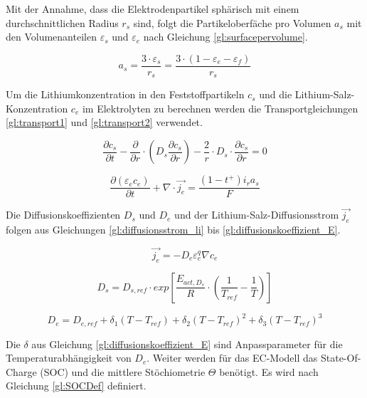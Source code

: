 Mit der Annahme, dass die Elektrodenpartikel sphärisch mit einem durchschnittlichen Radius $r_{s}$ sind, folgt die Partikeloberfäche pro Volumen $a_{s}$ mit den Volumenanteilen $\varepsilon_{s}$ und $\varepsilon_{e}$ nach Gleichung \ref{gl:surfacepervolume}.

\begin{equation}
	a_{s} = \frac{3\cdot \varepsilon_{s}}{r_{s}} = \frac{3 \cdot (1 - \varepsilon_{e} - \varepsilon_{f})}{r_{s}} \label{gl:surfacepervolume}
\end{equation}

Um die Lithiumkonzentration in den Feststoffpartikeln $c_{s}$ und die Lithium-Salz-Konzentration $c_{e}$ im Elektrolyten zu berechnen werden die Transportgleichungen \ref{gl:transport1} und \ref{gl:transport2} verwendet.

\begin{equation}
	\frac{\partial c_{s}}{\partial t} - \frac{\partial}{\partial r}\cdot \left( D_{s} \frac{\partial c_{s}}{\partial r} \right) - \frac{2}{r} \cdot D_{s} \cdot \frac{\partial c_{s}}{\partial r} = 0 \label{gl:transport1}
\end{equation}

\begin{equation}
	\frac{\partial (\varepsilon_{e}c_{e})}{\partial t} + \nabla \cdot \vec{j_{e}} = \frac{(1-t^{+}) i_{r} a_{s}}{F} \label{gl:transport2}
\end{equation}

Die Diffusionskoeffizienten $D_{s}$ und $D_{e}$ und der Lithium-Salz-Diffusionsstrom $\vec{j_{e}}$ folgen aus Gleichungen \ref{gl:diffusionsstrom_li} bis \ref{gl:diffusionskoeffizient_E}.

\begin{equation}
	\vec{j_{e}} = -D_{e} \varepsilon^{q}_{e} \nabla c_{e} \label{gl:diffusionsstrom_li}
\end{equation}

\begin{equation}
	D_{s} = D_{s,ref} \cdot exp \left[ \frac{E_{act,D_{s}}}{R} \cdot \left( \frac{1}{T_{ref}} - \frac{1}{T} \right) \right] \label{gl:diffusionskoeffizient_S}
\end{equation}

\begin{equation}
	D_{e} = D_{e,ref} + \delta_{1} (T- T_{ref}) + \delta_{2} (T- T_{ref})^{2} + \delta_{3} (T-T_{ref})^{3} \label{gl:diffusionskoeffizient_E}
\end{equation}

Die $\delta$ aus Gleichung \ref{gl:diffusionskoeffizient_E} sind Anpassparameter für die Temperaturabhängigkeit von $D_{e}$. Weiter werden für das EC-Modell das State-Of-Charge (SOC) und die mittlere Stöchiometrie $\Theta$ benötigt. Es wird nach Gleichung \ref{gl:SOCDef} definiert. 

